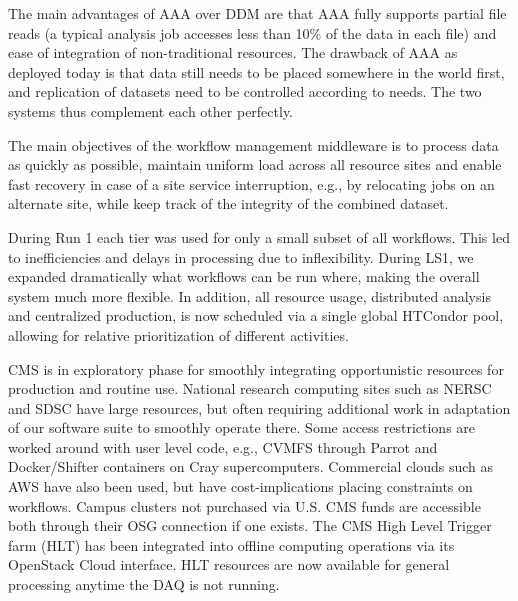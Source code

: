\documentclass[11pt,a4paper]{article}
\begin{document}
The main advantages of AAA over DDM are that AAA fully supports partial
file reads (a typical analysis job accesses less than 10\% of the data in
each file) and ease of integration of non-traditional resources. The
drawback of AAA as deployed today is that data still needs to be placed
somewhere in the world first, and replication of datasets need to be
controlled according to needs.  The two systems thus complement
each other perfectly.


The main objectives of the workflow management middleware is to
process data as quickly as possible, maintain uniform load across all
resource sites and enable fast recovery in case of a site service
interruption, e.g., by relocating jobs on an alternate site, while
keep track of the integrity of the combined dataset.  

During Run 1 each tier was used for only a small subset of all workflows.
This led to inefficiencies and delays in processing due to inflexibility.
During LS1, we expanded dramatically what workflows can be run where,
making the overall system much more flexible. In addition, all resource
usage, distributed analysis and centralized production, is now scheduled
via a single global HTCondor pool, allowing for relative prioritization of
different activities.


CMS is in exploratory phase for smoothly integrating opportunistic
resources for production and routine use. National research computing
sites such as NERSC and SDSC have large resources, but often requiring
additional work in adaptation of our software suite to smoothly
operate there. Some access restrictions are worked around with user
level code, e.g., CVMFS through Parrot and Docker/Shifter containers
on Cray supercomputers. Commercial clouds such as AWS have also been
used, but have cost-implications placing constraints on workflows.  
Campus clusters not purchased via U.S. CMS funds are accessible both
through their OSG connection if one exists.
The CMS High Level Trigger farm (HLT) has been integrated into offline computing operations
via its OpenStack Cloud interface. HLT resources are now available for general processing anytime the
DAQ is not running.
\end{document}
